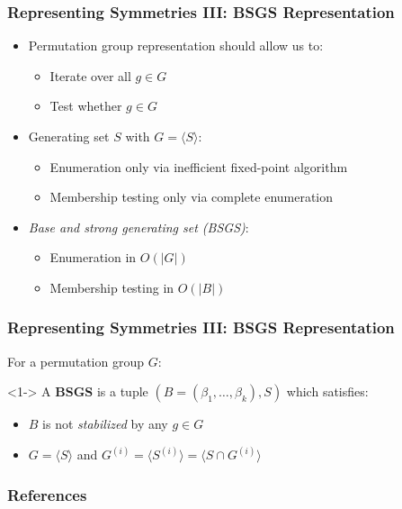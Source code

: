 \documentclass{beamer}
\begin{document}
\begin{frame}
  \frametitle{Representing Symmetries III: BSGS Representation}

  \begin{itemize}
    \setlength\itemsep{.5cm}
    \item<1-> Permutation group representation should allow us to:
      \begin{itemize}
        \item Iterate over all $g \in G$
        \item Test whether $g \in G$
      \end{itemize}
    \item<2-> Generating set $S$ with $G = \langle S \rangle$:
      \begin{itemize}
        \item Enumeration only via inefficient fixed-point algorithm
        \item Membership testing only via complete enumeration
      \end{itemize}
    \item<3-> \textit{Base and strong generating set (BSGS)}:
      \begin{itemize}
        \item Enumeration in $O(|G|)$
        \item Membership testing in $O(|B|)$
      \end{itemize}
  \end{itemize}
\end{frame}

\begin{frame}
  \frametitle{Representing Symmetries III: BSGS Representation}

  For a permutation group $G$:

  \vspace{.5cm}

  \begin{definition}<1->
    A \textbf{BSGS} is a tuple $(B = (\beta_1, \dots, \beta_k), S)$ which satisfies:
    \begin{itemize}
      \item $B$ is not \textit{stabilized} by any $g \in G$
      \item $G = \langle S \rangle$ and $G^{(i)} = \langle S^{(i)} \rangle =
            \langle S \cap G^{(i)} \rangle$
    \end{itemize}
  \end{definition}

  \vspace{.5cm}

\end{frame}

\begin{frame}
  \frametitle{References}

  
  
\end{frame}
\end{document}
